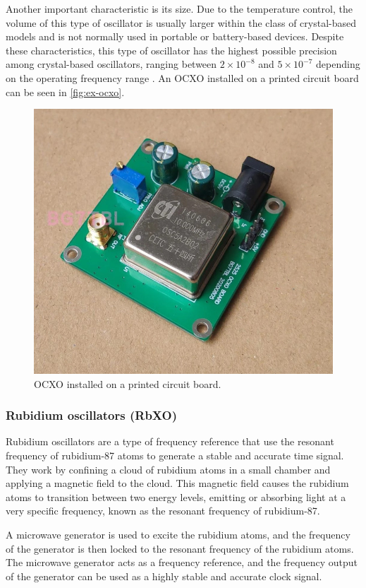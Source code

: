 Another important characteristic is its size. Due to the temperature control, the volume of this type of oscillator is usually larger within the class of crystal-based models and is not normally used in portable or battery-based devices. Despite these characteristics, this type of oscillator has the highest possible precision among crystal-based oscillators, ranging between $2 \times 10^{-8}$ and $5 \times 10^{-7}$ depending on the operating frequency range \cite{mancini2004}. An OCXO installed on a printed circuit board can be seen in \autoref{fig:ex-ocxo}.

\begin{figure}[!ht]
    \begin{center}
        \includegraphics[width=0.5\columnwidth]{figures/ex-ocxo.jpg}
        \caption{OCXO installed on a printed circuit board.}
        \label{fig:ex-ocxo}
    \end{center}
\end{figure}

\subsubsection{Rubidium oscillators (RbXO)}


Rubidium oscillators are a type of frequency reference that use the resonant frequency of rubidium-87 atoms to generate a stable and accurate time signal. They work by confining a cloud of rubidium atoms in a small chamber and applying a magnetic field to the cloud. This magnetic field causes the rubidium atoms to transition between two energy levels, emitting or absorbing light at a very specific frequency, known as the resonant frequency of rubidium-87.

A microwave generator is used to excite the rubidium atoms, and the frequency of the generator is then locked to the resonant frequency of the rubidium atoms. The microwave generator acts as a frequency reference, and the frequency output of the generator can be used as a highly stable and accurate clock signal.

